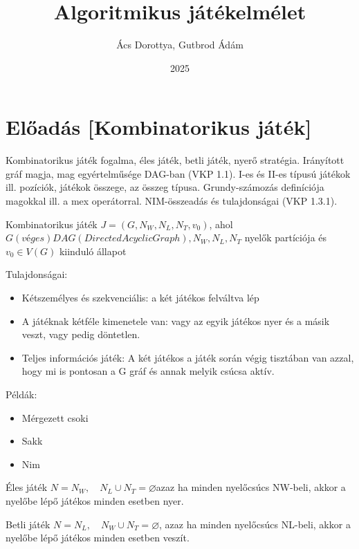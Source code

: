 

	
	\title{Algoritmikus játékelmélet}
	\author{Ács Dorottya, Gutbrod Ádám}
	\date{2025}
	\maketitle
	
	\tableofcontents
	\newpage
	
	
	
	
	\section{Előadás [Kombinatorikus játék]}
	Kombinatorikus játék fogalma, éles játék, betli játék, nyerő stratégia.  Irányított gráf magja, mag egyértelműsége DAG-ban (VKP 1.1). I-es és II-es típusú játékok ill. pozíciók, játékok összege, az összeg típusa. Grundy-számozás definíciója magokkal ill. a mex operátorral. NIM-összeadás és tulajdonságai (VKP 1.3.1).
	\begin{definition}{Kombinatorikus játék}{}
		$ J=(G,N_W,N_L,N_T,v_0) $, ahol $ G (véges) DAG (Directed Acyclic Graph), N_W,N_L,N_T$ nyelők partíciója és $v_0 \in V(G)$ kiinduló állapot
	\end{definition}
	Tulajdonságai:
	\begin{itemize}
		\item Kétszemélyes és szekvenciális: a két játékos felváltva lép
		\item A játéknak kétféle kimenetele van: vagy az egyik játékos nyer és a másik veszt, vagy pedig döntetlen.
		\item Teljes információs játék: A két játékos a játék során végig tisztában van azzal, hogy mi is pontosan a G gráf és annak melyik csúcsa aktív.
	\end{itemize}
	Példák:
	\begin{itemize}
		\item Mérgezett csoki
		\item Sakk
		\item Nim
	\end{itemize}
	
	\begin{definition}{Éles játék}{}
		$N=N_W, \quad N_L \cup N_T=\varnothing$azaz ha minden nyelőcsúcs NW-beli, akkor a nyelőbe lépő játékos minden esetben nyer.
	\end{definition}
	
	\begin{definition}{Betli játék}{}
		$N=N_L, \quad N_W \cup N_T = \varnothing$, azaz ha minden nyelőcsúcs NL-beli, akkor a nyelőbe lépő játékos minden esetben veszít.
	\end{definition}
	
